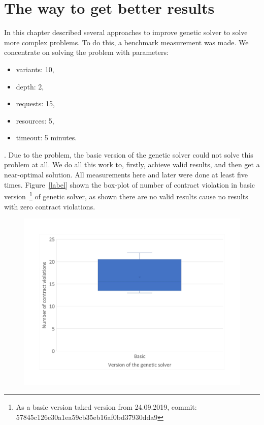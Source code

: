 \chapter{The way to get better results}
In this chapter described several approaches to improve genetic solver to solve more complex problems.
To do this, a benchmark measurement was made.
We concentrate on solving the problem with parameters:
\begin{itemize}
	\item variants: 10,
	\item depth: 2,
	\item requests: 15,
	\item resources: 5,
	\item timeout: 5 minutes.
\end{itemize}.
Due to the problem, the basic version of the genetic solver could not solve this problem at all. We do all this work to, firstly, achieve valid results, and then get a near-optimal solution. 
All measurements here and later were done at least five times. 
Figure~\ref{label} shown the box-plot of number of contract violation in basic version~\footnote{As a basic version taked version from 24.09.2019, commit: 57845c126c30a1ea59cb35eb16af0bd37930dda9} of genetic solver, as shown there are no valid results cause no results with zero contract violations.

\begin{figure}
	\centering
	\includegraphics[width=\textwidth]{images/BoxPlotSolverBasic}
	\caption[Boxplot of number of contract violations for the basic version of genetic solver]{}
	\label{fig:boxplotsolverbasic}
\end{figure}


